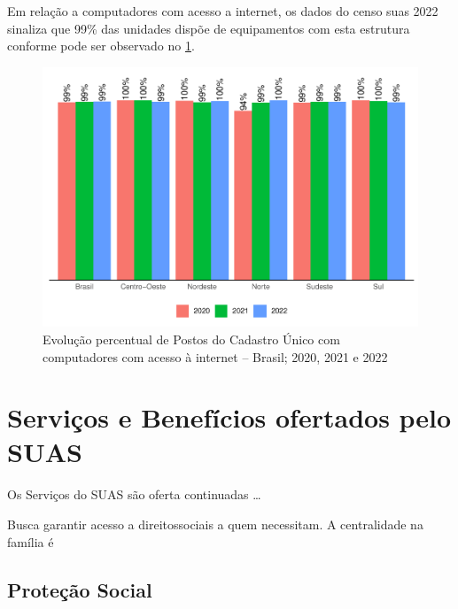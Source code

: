 \documentclass[
  brazilian]{report}
\begin{document}
Em relação a computadores com acesso a internet, os dados do censo suas
2022 sinaliza que 99\% das unidades dispõe de equipamentos com esta
estrutura conforme pode ser observado no
\cref{fig:postcad-internet-percentual}.

\begin{figure}
\includegraphics{Censo-SUAS-2022_files/figure-latex/postcad-internet-percentual-1} \caption[Evolução percentual de Postos do Cadastro Único com computadores com acesso à internet – Brasil]{Evolução percentual de Postos do Cadastro Único com computadores com acesso à internet – Brasil;  2020, 2021 e 2022}\label{fig:postcad-internet-percentual}
\end{figure}

\hypertarget{serviuxe7os-e-benefuxedcios-ofertados-pelo-suas}{%
\chapter{Serviços e Benefícios ofertados pelo
SUAS}\label{serviuxe7os-e-benefuxedcios-ofertados-pelo-suas}}

Os Serviços do SUAS são oferta continuadas \ldots{}

Busca garantir acesso a direitossociais a quem necessitam. A
centralidade na família é 

\hypertarget{proteuxe7uxe3o-social}{%
\section{Proteção Social}\label{proteuxe7uxe3o-social}}
\end{document}
